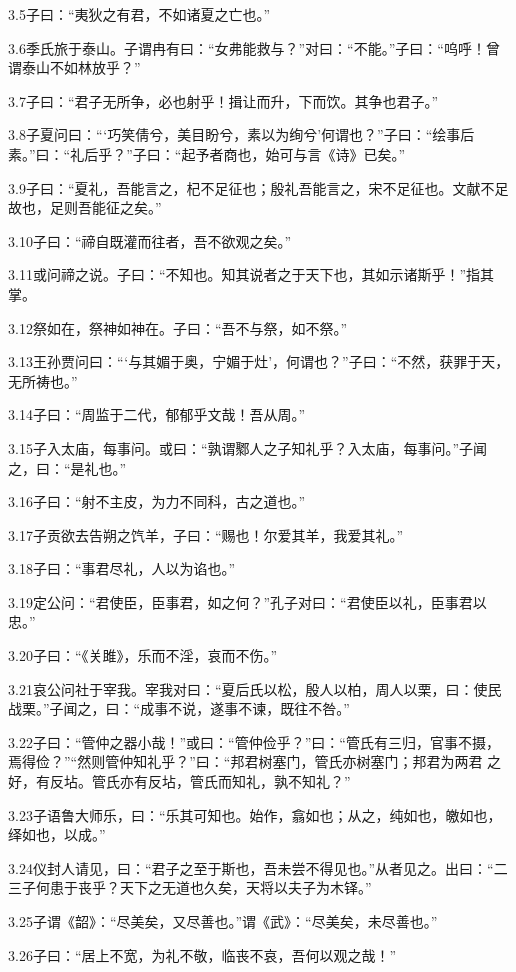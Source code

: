 \documentclass[a4paper,12pt,UTF8,twoside]{ctexbook}
\begin{document}
3.5子曰：“夷狄之有君，不如诸夏之亡也。”


3.6季氏旅于泰山。子谓冉有曰：“女弗能救与？”对曰：“不能。”子曰：“呜呼！曾谓泰山不如林放乎？”

3.7子曰：“君子无所争，必也射乎！揖让而升，下而饮。其争也君子。”

3.8子夏问曰：“‘巧笑倩兮，美目盼兮，素以为绚兮’何谓也？”子曰：“绘事后素。”曰：“礼后乎？”子曰：“起予者商也，始可与言《诗》已矣。”

3.9子曰：“夏礼，吾能言之，杞不足征也；殷礼吾能言之，宋不足征也。文献不足故也，足则吾能征之矣。”

3.10子曰：“禘自既灌而往者，吾不欲观之矣。”

3.11或问禘之说。子曰：“不知也。知其说者之于天下也，其如示诸斯乎！”指其掌。

3.12祭如在，祭神如神在。子曰：“吾不与祭，如不祭。”

3.13王孙贾问曰：“‘与其媚于奥，宁媚于灶’，何谓也？”子曰：“不然，获罪于天，无所祷也。”

3.14子曰：“周监于二代，郁郁乎文哉！吾从周。”

3.15子入太庙，每事问。或曰：“孰谓鄹人之子知礼乎？入太庙，每事问。”子闻之，曰：“是礼也。”

3.16子曰：“射不主皮，为力不同科，古之道也。”

3.17子贡欲去告朔之饩羊，子曰：“赐也！尔爱其羊，我爱其礼。”

3.18子曰：“事君尽礼，人以为谄也。”

3.19定公问：“君使臣，臣事君，如之何？”孔子对曰：“君使臣以礼，臣事君以忠。”

3.20子曰：“《关雎》，乐而不淫，哀而不伤。”

3.21哀公问社于宰我。宰我对曰：“夏后氏以松，殷人以柏，周人以栗，曰：使民战栗。”子闻之，曰：“成事不说，遂事不谏，既往不咎。”

3.22子曰：“管仲之器小哉！”或曰：“管仲俭乎？”曰：“管氏有三归，官事不摄，焉得俭？”“然则管仲知礼乎？”曰：“邦君树塞门，管氏亦树塞门；邦君为两君
之好，有反坫。管氏亦有反坫，管氏而知礼，孰不知礼？”

3.23子语鲁大师乐，曰：“乐其可知也。始作，翕如也；从之，纯如也，皦如也，绎如也，以成。”

3.24仪封人请见，曰：“君子之至于斯也，吾未尝不得见也。”从者见之。出曰：“二三子何患于丧乎？天下之无道也久矣，天将以夫子为木铎。”

3.25子谓《韶》：“尽美矣，又尽善也。”谓《武》：“尽美矣，未尽善也。”

3.26子曰：“居上不宽，为礼不敬，临丧不哀，吾何以观之哉！”
\end{document}
